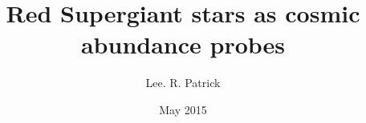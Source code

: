 \documentclass[a4paper,12pt,oneside,openright]{book}
\title{Red Supergiant stars as cosmic abundance probes}
\author{Lee. R. Patrick}
\date{May 2015} %
\begin{document}
\singlespacing
\maketitlepage
\frontmatter
\eighteenptleading



% 

\cleardoublepage
{}
{}
\setcounter{tocdepth}{2}
\tableofcontents


\setlength{\bibhang}{2.0em}
\setlength{}

\newcommand{\mdot}{\ensuremath{\dot{M}}}
\newcommand{\msun}{\ensuremath{M_{\odot}}}
\newcommand{\vsini}{\ensuremath{v_{\rm R} \sin i}}
\newcommand{\vrot}{\ensuremath{v_{\rm R}}}
\def\5{\footnotesize V\normalsize}
\def\4{\footnotesize IV\normalsize}
\def\3{\footnotesize III\normalsize}
\def\2{\footnotesize II\normalsize}
\def\1{\footnotesize I\normalsize}
\def\lam{$\lambda$}
\def\kms{$\mbox{km s}^{-1}$}
\def\p{$\phantom{:}$}
\def\a{$\phantom{^\ast}$}
\def\v{$\phantom{^{l}}$}
\def\pp{$\phantom{-}$}
\def\o{$\phantom{0}$}
\def\vr{$v_{\rm r}$}

\mainmatter
\eighteenptleading








\appendix
{}
% 

\backmatter

\singlespace

% 
% 
\end{document}
